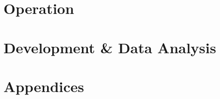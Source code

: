 \documentclass[a4paper, 11pt, oneside]{book}
\begin{document}
\part{Operation}





\part{Development \& Data Analysis}



\part{Appendices}
\appendix







\end{document}
